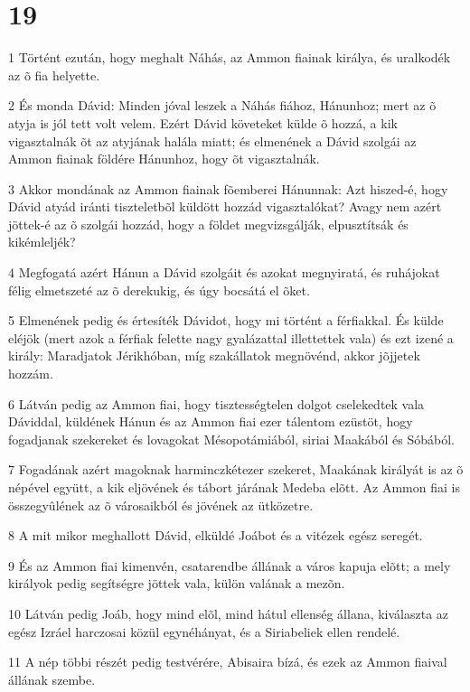 \chapter{19}

\par 1 Történt ezután, hogy meghalt Náhás, az Ammon fiainak királya, és uralkodék az õ fia helyette.
\par 2 És monda Dávid: Minden jóval leszek a Náhás fiához, Hánunhoz; mert az õ atyja is jól tett volt velem. Ezért Dávid követeket külde õ hozzá, a kik vigasztalnák õt az atyjának halála miatt; és elmenének a Dávid szolgái az Ammon fiainak földére Hánunhoz, hogy õt vigasztalnák.
\par 3 Akkor mondának az Ammon fiainak fõemberei Hánunnak: Azt hiszed-é, hogy Dávid atyád iránti tiszteletbõl küldött hozzád vigasztalókat? Avagy nem azért jöttek-é az õ szolgái hozzád, hogy a földet megvizsgálják, elpusztítsák és kikémleljék?
\par 4 Megfogatá azért Hánun a Dávid szolgáit és azokat megnyiratá, és ruhájokat félig elmetszeté az õ derekukig, és úgy bocsátá el õket.
\par 5 Elmenének pedig és értesíték Dávidot, hogy mi történt a férfiakkal. És külde eléjök (mert azok a férfiak felette nagy gyalázattal illettettek vala) és ezt izené a király: Maradjatok Jérikhóban, míg szakállatok megnövénd, akkor jõjjetek hozzám.
\par 6 Látván pedig az Ammon fiai, hogy tisztességtelen dolgot cselekedtek vala Dáviddal, küldének Hánun és az Ammon fiai ezer tálentom ezüstöt, hogy fogadjanak szekereket és lovagokat Mésopotámiából, siriai Maakából és Sóbából.
\par 7 Fogadának azért magoknak harminczkétezer szekeret, Maakának királyát is az õ népével együtt, a kik eljövének és tábort járának Medeba elõtt. Az Ammon fiai is összegyûlének az õ városaikból és jövének az ütközetre.
\par 8 A mit mikor meghallott Dávid, elküldé Joábot és a vitézek egész seregét.
\par 9 És az Ammon fiai kimenvén, csatarendbe állának a város kapuja elõtt; a mely királyok pedig segítségre jöttek vala, külön valának a mezõn.
\par 10 Látván pedig Joáb, hogy mind elõl, mind hátul ellenség állana, kiválaszta az egész Izráel harczosai közül egynéhányat, és a Siriabeliek ellen rendelé.
\par 11 A nép többi részét pedig testvérére, Abisaira bízá, és ezek az Ammon fiaival állának szembe.
